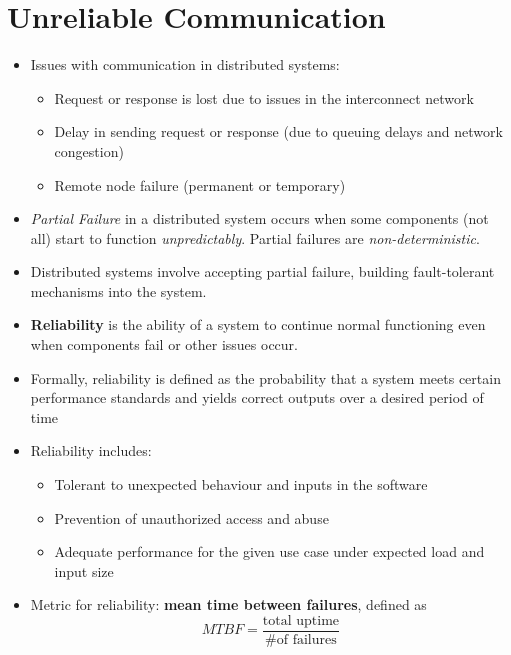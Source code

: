 \documentclass{article}
\begin{document}
\section{Unreliable Communication}
\begin{itemize}

    \item Issues with communication in distributed systems:
    \begin{itemize}
        \item Request or response is lost due to issues in the interconnect network 
        \item Delay in sending request or response (due to queuing delays and network congestion)
    
        \item Remote node failure (permanent or temporary)
    \end{itemize}
    
    \item \textit{Partial Failure} in a distributed system occurs when some components (not all) start to function \textit{unpredictably}. Partial failures are \textit{non-deterministic}.
    
    \item Distributed systems involve accepting partial failure, building fault-tolerant mechanisms into the system.
    
    \item \textbf{Reliability} is the ability of a system to continue normal functioning even when components fail or other issues occur. 
    
    \item Formally, reliability is defined as the probability that a system meets certain performance standards and yields correct outputs over a desired period of time
    
    \item Reliability includes:
    \begin{itemize}
        \item Tolerant to unexpected behaviour and inputs in the software
        
        \item Prevention of unauthorized access and abuse
        
        \item Adequate performance for the given use case under expected load and input size
    \end{itemize}
    
    \item Metric for reliability: \textbf{mean time between failures}, defined as
    \begin{equation*}
        MTBF = \frac{\text{total uptime}}{\text{\# of failures}}
    \end{equation*}
    

\end{itemize}
\end{document}
